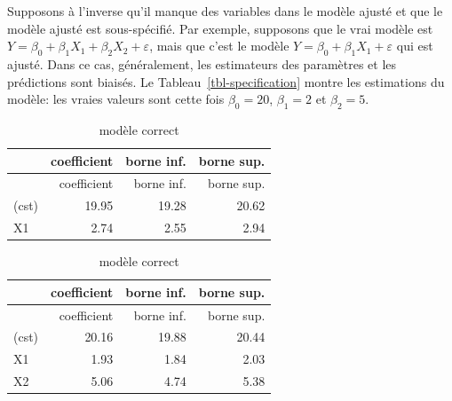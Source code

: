 \documentclass[
  11pt,
  letterpaper,
]{scrbook}
\theoremstyle{definition}
\theoremstyle{remark}
\begin{document}
Supposons à l'inverse qu'il manque des variables dans le modèle ajusté
et que le modèle ajusté est sous-spécifié. Par exemple, supposons que le
vrai modèle est \(Y=\beta_0+\beta_1X_1+\beta_2X_2+\varepsilon\), mais
que c'est le modèle \(Y=\beta_0+\beta_1X_1+\varepsilon\) qui est ajusté.
Dans ce cas, généralement, les estimateurs des paramètres et les
prédictions sont biaisés. Le Tableau~\ref{tbl-specification} montre les
estimations du modèle: les vraies valeurs sont cette fois
\(\beta_0=20\), \(\beta_1 = 2\) et \(\beta_2 = 5\).

\begin{table}

\caption{\label{tbl-specification2}Sous-spécification de modèle de
régression linéaire pour des données simulées.}

\begin{minipage}{0.50\linewidth}

\begin{longtable}[]{@{}lrrr@{}}
\caption{modèle sous-spécifié}\tabularnewline
\toprule\noalign{}
& coefficient & borne inf. & borne sup. \\
\midrule\noalign{}
\endfirsthead
\toprule\noalign{}
& coefficient & borne inf. & borne sup. \\
\midrule\noalign{}
\endhead
\bottomrule\noalign{}
\endlastfoot
(cst) & 19.95 & 19.28 & 20.62 \\
X1 & 2.74 & 2.55 & 2.94 \\
\end{longtable}

\end{minipage}%
%
\begin{minipage}{0.50\linewidth}

\begin{longtable}[]{@{}lrrr@{}}
\caption{modèle correct}\tabularnewline
\toprule\noalign{}
& coefficient & borne inf. & borne sup. \\
\midrule\noalign{}
\endfirsthead
\toprule\noalign{}
& coefficient & borne inf. & borne sup. \\
\midrule\noalign{}
\endhead
\bottomrule\noalign{}
\endlastfoot
(cst) & 20.16 & 19.88 & 20.44 \\
X1 & 1.93 & 1.84 & 2.03 \\
X2 & 5.06 & 4.74 & 5.38 \\
\end{longtable}

\end{minipage}%

\end{table}%
\end{document}
